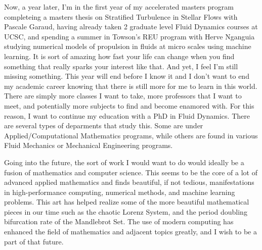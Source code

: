 \documentclass{article}
\begin{document}
Now, a year later, I'm in the first year of my accelerated masters program completeing a masters thesis on Stratified Turbulence in Stellar Flows with Pascale Garaud, having already taken 2 graduate level Fluid Dynamics courses at UCSC, and spending a summer in Towson's REU program with Herve Nganguia studying numerical models of propulsion in fluids at micro scales using machine learning. It is sort of amazing how fast your life can change when you find something that really sparks your interest like that. And yet, I feel I'm still missing something. This year will end before I know it and I don't want to end my academic career knowing that there is still more for me to learn in this world. There are simply more classes I want to take, more professors that I want to meet, and potentially more subjects to find and become enamored with. For this reason, I want to continue my education with a PhD in Fluid Dynamics. There are several types of deparments that study this. Some are under Applied/Computational Mathematics programs, while others are found in various Fluid Mechanics or Mechanical Engineering programs. 

Going into the future, the sort of work I would want to do would ideally be a fusion of mathematics and computer science. This seems to be the core of a lot of advanced applied mathematics and finds beautiful, if not tedious, manifestations in high-performance computing, numerical methods, and machine learning problems. This art has helped realize some of the more beautiful mathematical pieces in our time such as the chaotic Lorenz System, and the period doubling bifurcation rate of the Mandlebrot Set. The use of modern computing has enhanced the field of mathematics and adjacent topics greatly, and I wish to be a part of that future. 
\end{document}
